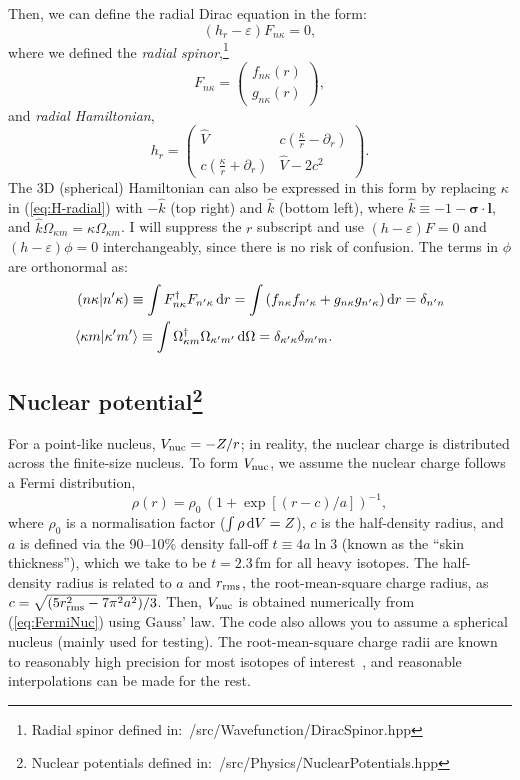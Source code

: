 \documentclass[10pt,twocolumn,a4paper]{article}%
\newcommand{\braket}[1]{\ensuremath{\langle #1\rangle}}	%
\newcommand{\matr}[4]{\ensuremath{\begin{pmatrix}#1&#2\\#3&#4\end{pmatrix}}}	%
\newcommand{\twocomp}[2]{\ensuremath{\begin{pmatrix}#1\\#2\end{pmatrix}}}	%
\renewcommand{\v}[1]{\ensuremath{\boldsymbol{#1}}}		%
\newcommand{\be}{\begin{equation}}
\newcommand{\ee}{\end{equation}}
\def\d{\ensuremath{{\rm d}}}
\def\en{\ensuremath{\varepsilon}}
\def\p{\ensuremath{\partial}}
\newcommand{\s}{\ensuremath{\sigma}}
\renewcommand{\k}{\ensuremath{\kappa}}
\begin{document}
Then, we can define the radial Dirac equation in the form: 
\be\label{eq:Dirac-radial}
\left(h_r - \en\right)F_{n\k} = 0,
\ee
where we defined the {\em radial spinor},\footnote{Radial spinor defined in:~/src/Wavefunction/DiracSpinor.hpp}
\be\label{eq:F-radial}
F_{n\k} =\twocomp {f_{n\k}(r)}{g_{n\k}(r)},
\ee
and {\em radial Hamiltonian},
\be\label{eq:H-radial}
h_r = \matr 	{\hat V} 				{c(\frac{\k}{r}-\p_r )}
			{c(\frac{\k}{r} + \p_r  )}	{\hat V-2c^2}.
\ee
The 3D (spherical) Hamiltonian can also be expressed in this form by replacing $\k$ in (\ref{eq:H-radial}) with $-\hat k$ (top right) and $\hat k$ (bottom left), where $\hat k \equiv -1 - \v{\s}\cdot\v{l}$,  and $\hat k\Omega_{\k m} = \k\Omega_{\k m}$.
I will suppress the $r$ subscript and use
$\left(h - \en\right)F = 0$ and $\left(h - \en\right)\phi = 0$ interchangeably, since there is no risk of confusion.
%
The terms in $\phi$ are orthonormal as: 
\begin{align}
&\left(n\k|n'\k\right)\equiv\int F_{n\k}^\dag F_{n'\k}\,\d r = \int\left(f_{n\k}f_{n'\k}+g_{n\k}g_{n'\k}\right)\d r = \delta_{n'n}\notag\\
\label{eq:ffrad}
&\braket{\k m|\k'm'}\equiv\int\Omega_{\k m}^\dag\Omega_{\k' m'}\,\d \Omega = \delta_{\k'\k}\delta_{m'm}.
\end{align}

\subsection[Nuclear potential]{Nuclear potential\footnote{Nuclear potentials defined in:~/src/Physics/NuclearPotentials.hpp}}

 
For a point-like nucleus, $V_{\rm nuc} = -Z/r$;
in reality, the nuclear charge is distributed across the finite-size nucleus. 
To form $V_{\rm nuc}$, we assume the nuclear charge follows a Fermi distribution,
\begin{equation}\label{eq:FermiNuc}
\rho(r) = {\rho_0}\,{\left(1+\exp[(r-c)/a]\right)^{-1}},
\end{equation}
where $\rho_0$ is a normalisation factor ($\int\rho\,\d V = Z$), 
$c$ is the half-density radius, and 
$a$ is defined via the 90--10\% density fall-off {${t\equiv 4a\ln3}$} (known as the ``skin thickness''),
which we take to be $t=2.3$\,{\rm fm} for all heavy isotopes.
The half-density radius is related to $a$ and $r_{\rm rms}$, the root-mean-square charge radius, as $c = \sqrt{(5 r_{\rm rms}^2 -7\pi^2a^2)/3}$.
Then, $V_{\rm nuc}$ is obtained numerically from (\ref{eq:FermiNuc}) using Gauss' law.
The code also allows you to assume a spherical nucleus (mainly used for testing).
The root-mean-square charge radii are known to reasonably high precision for most isotopes of interest~\cite{Angeli2013}, and reasonable interpolations can be made for the rest.
\end{document}

